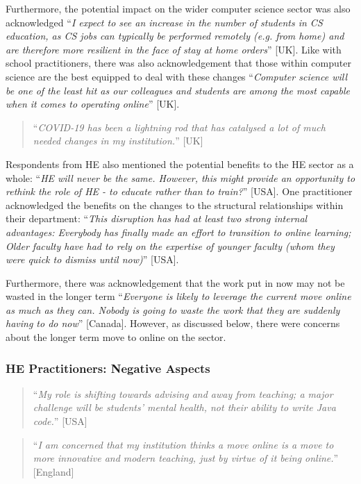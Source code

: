\documentclass[conference]{IEEEtran}
\begin{document}
Furthermore, the potential impact on the wider computer science sector
was also acknowledged ``{\emph{I expect to see an increase in the
number of students in CS education, as CS jobs can typically be
performed remotely (e.g. from home) and are therefore more resilient
in the face of stay at home orders}}'' [UK]. Like with school
practitioners, there was also acknowledgement that those within
computer science are the best equipped to deal with these changes
``{\emph{Computer science will be one of the least hit as our
colleagues and students are among the most capable when it comes to
operating online}}'' [UK].

\begin{quotation}
``{\emph{COVID-19 has been a lightning rod that has catalysed a lot of
    much needed changes in my institution.}}'' [UK]
\end{quotation}

Respondents from HE also mentioned the potential benefits to the HE
sector as a whole: ``{\emph{HE will never be the same. However, this
might provide an opportunity to rethink the role of HE - to educate
rather than to train?}}'' [USA]. One practitioner acknowledged the
benefits on the changes to the structural relationships within their
department: ``{\emph{This disruption has had at least two strong
internal advantages: Everybody has finally made an effort to
transition to online learning; Older faculty have had to rely on the
expertise of younger faculty (whom they were quick to dismiss until
now)}}'' [USA].

Furthermore, there was acknowledgement that the work put in now may
not be wasted in the longer term ``{\emph{Everyone is likely to
leverage the current move online as much as they can. Nobody is going
to waste the work that they are suddenly having to do now}}''
[Canada]. However, as discussed below, there were concerns about the
longer term move to online on the sector.

\subsubsection{HE Practitioners: Negative Aspects}

\begin{quotation}
``{\emph{My role is shifting towards advising and away from
teaching; a major challenge will be students' mental health, not their
ability to write Java code.}}'' [USA]
\end{quotation}

\begin{quotation}
``{\emph{I am concerned that my institution thinks a move online is a
move to more innovative and modern teaching, just by virtue of it
being online.}}'' [England]
\end{quotation}
\end{document}

